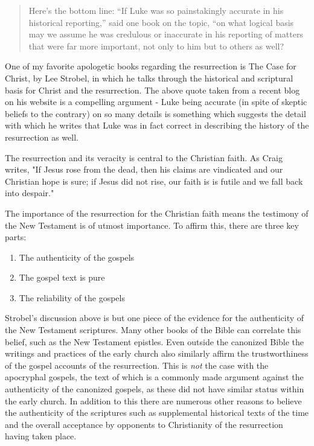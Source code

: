 \documentclass[12pt]{turabian-researchpaper}
\begin{document}
\begin{quotation}
\noindent Here’s the bottom line: “If Luke was so painstakingly accurate in his historical reporting,” said one book on the topic, “on what logical basis may we assume he was credulous or inaccurate in his reporting of matters that were far more important, not only to him but to others as well?\autocite{strobel2017}

\end{quotation}
One of my favorite apologetic books regarding the resurrection is The Case for Christ, by Lee Strobel, in which he talks through the historical and scriptural basis for Christ and the resurrection.\autocite{church2009case} The above quote taken from a recent blog on his website is a compelling argument - Luke being accurate (in spite of skeptic beliefs to the contrary) on so many details is something which suggests the detail with which he writes that Luke was in fact correct in describing the history of the resurrection as well.

The resurrection and its veracity is central to the Christian faith. As Craig writes, "If Jesus rose from the dead, then his claims are vindicated and our Christian hope is sure; if Jesus did not rise, our faith is is futile and we fall back into despair."\autocite[pg.333]{craig2008reasonable} 

The importance of the resurrection for the Christian faith means the testimony of the New Testament is of utmost importance. To affirm this, there are three key parts\autocite[pg.336]{craig2008reasonable}:

\begin{enumerate}
\item The authenticity of the gospels
\item The gospel text is pure
\item The reliability of the gospels
\end{enumerate} 

Strobel's discussion above is but one piece of the evidence for the authenticity of the New Testament scriptures. Many other books of the Bible can correlate this belief, such as the New Testament epistles. Even outside the canonized Bible the writings and practices of the early church also similarly affirm the trustworthiness of the gospel accounts of the resurrection. This is \textit{not} the case with the apocryphal gospels, the text of which is a commonly made argument against the authenticity of the canonized gospels, as these did not have similar status within the early church. In addition to  this there are numerous other reasons to believe the authenticity of the scriptures such as supplemental historical texts of the time and  the overall acceptance by opponents to Christianity of the resurrection having taken place.
\end{document}
